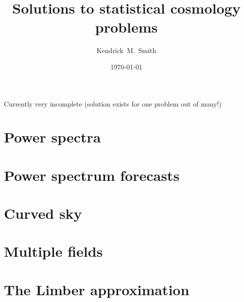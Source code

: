 \documentclass[aps,prd,superscriptaddress,groupedaddress,nofootinbib,nobibnotes]{revtex4}
\begin{document}
\title{Solutions to statistical cosmology problems}

\author{Kendrick~M.~Smith}

\date{\today}


\maketitle

Currently very incomplete (solution exists for one problem out of many!)

\section{Power spectra}

\section{Power spectrum forecasts}

\section{Curved sky}

\section{Multiple fields}

\section{The Limber approximation}
\end{document}
